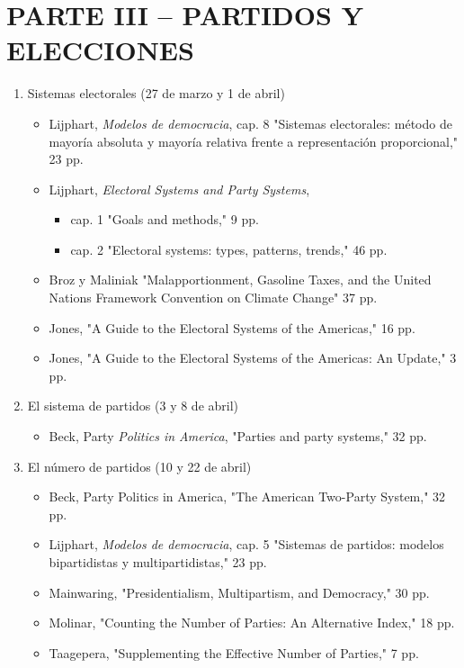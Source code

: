 \documentclass{article}
\begin{document}
\section{PARTE III – PARTIDOS Y ELECCIONES}
\label{sec:org9368348}
\begin{enumerate}
\item Sistemas electorales  (27 de marzo y 1 de abril)
\label{sec:orgd6a323b}
\begin{itemize}
\item Lijphart, \emph{Modelos de democracia}, cap. 8 "Sistemas electorales: método de mayoría absoluta y mayoría relativa frente a representación proporcional," 23 pp.
\item Lijphart, \emph{Electoral Systems and Party Systems}, 
\begin{itemize}
\item cap. 1 "Goals and methods," 9 pp.
\item cap. 2 "Electoral systems: types, patterns, trends," 46 pp.
\end{itemize}
\item Broz y Maliniak "Malapportionment, Gasoline Taxes, and the United Nations Framework Convention on Climate Change" 37 pp.
\item Jones, "A Guide to the Electoral Systems of the Americas," 16 pp.
\item Jones, "A Guide to the Electoral Systems of the Americas: An Update," 3 pp.
\end{itemize}
\item El sistema de partidos  (3 y 8 de abril)
\label{sec:org8b9d2f6}
\begin{itemize}
\item Beck, Party \emph{Politics in America}, "Parties and party systems," 32 pp.
\end{itemize}
\item El número de partidos  (10 y 22 de abril)
\label{sec:org73d6aef}
\begin{itemize}
\item Beck, Party Politics in America, "The American Two-Party System," 32 pp.
\item Lijphart, \emph{Modelos de democracia}, cap. 5 "Sistemas de partidos: modelos bipartidistas y multipartidistas," 23 pp.
\item Mainwaring, "Presidentialism, Multipartism, and Democracy," 30 pp.
\item Molinar, "Counting the Number of Parties: An Alternative Index," 18 pp.
\item Taagepera, "Supplementing the Effective Number of Parties," 7 pp.

\end{itemize}
\end{enumerate}
\end{document}
